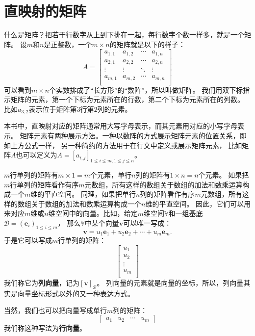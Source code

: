 \documentclass[12pt,UTF8,fontset=none]{ctexbook}
\begin{document}
\section{直映射的矩阵} 

什么是矩阵？把若干行数字从上到下排在一起，每行数字个数一样多，就是一个矩阵。
设$m$和$n$是正整数，一个$m\times n$的矩阵就是以下的样子：
$$
A = \left[
\begin{matrix}
 a_{1,1}     & a_{1,2}   & \cdots & a_{1,n} \\
 a_{2,1}     & a_{2,2}   & \cdots & a_{2,n} \\
 \vdots      & \vdots    & \ddots & \vdots  \\
 a_{m,1}     & a_{m,2}   & \cdots & a_{m,n} \\
\end{matrix}
\right]
$$
可以看到$m\times n$个实数排成了“长方形”的“数阵”，所以叫做矩阵。
我们用双下标指示矩阵的元素，第一个下标为元素所在的行数，第二个下标为元素所在的列数。
比如$a_{3,2}$表示位于矩阵第$3$行第$2$列的元素。

本书中，直映射对应的矩阵通常用大写字母表示，而其元素用对应的小写字母表示。
矩阵元素有两种展示方法。一种以数阵的方式展示矩阵元素的位置关系，即如上方公式一样，
另一种简约的方法用于在行文中定义或展示矩阵元素，
比如矩阵$A$也可以定义为$A = [a_{i,j}]_{1\leqslant i\leqslant m, 1\leqslant j\leqslant n}$。

$m$行单列的矩阵有$m \times 1 = m$个元素，单行$n$列的矩阵有$1 \times n = n$个元素。
如果把$m$行单列的矩阵看作有序$m$元数组，所有这样的数组关于数组的加法和数乘运算构成一个$m$维的平直空间。
同理，如果把单行$n$列的矩阵看作有序$m$元数组，所有这样的数组关于数组的加法和数乘运算构成一个$n$维的平直空间。
因此，它们可以用来对应$m$维或$n$维空间中的向量。比如，给定$m$维空间$\mathbb{V}$和一组基底$\mathcal{B} = \left(\mathbf{e}_i\right)_{1\leqslant i\leqslant m}$，
那么$\mathbb{V}$中某个向量$\mathbf{v}$可以唯一写成：
$$ \mathbf{v} = u_1\mathbf{e}_1 + u_2\mathbf{e}_2 + \cdots + u_m\mathbf{e}_m.$$
于是它可以写成$m$行单列的矩阵：
$$
\begin{bmatrix}
    u_{1} \\
    u_{2} \\
    \vdots  \\
    u_{m}  \\
   \end{bmatrix}
$$
我们称它为\textbf{列向量}，记为$[\mathbf{v}]_{\mathcal{B}}$。
列向量的元素就是向量的坐标，所以，列向量其实是向量坐标形式以外的又一种表达方式。

当然，我们也可以把向量写成单行$m$列的矩阵：
$$
\begin{bmatrix}
    u_{1} & u_{2} &\cdots & u_{m}
   \end{bmatrix}
$$
我们称这种写法为\textbf{行向量}。
\end{document}
